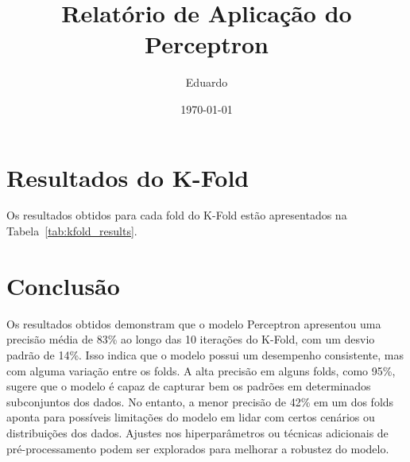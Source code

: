 \documentclass[a4paper,12pt]{article}
\begin{document}
\title{Relatório de Aplicação do Perceptron}
\author{Eduardo}
\date{\today}
\maketitle

\section*{Resultados do K-Fold}

Os resultados obtidos para cada fold do K-Fold estão apresentados na Tabela~\ref{tab:kfold_results}.

\begin{table}[H]
  \centering
  \caption{Resultados do K-Fold}
  \label{tab:kfold_results}
\end{table}

\section*{Conclusão}

Os resultados obtidos demonstram que o modelo Perceptron apresentou uma precisão média de 83\% ao longo das 10 iterações do K-Fold, com um desvio padrão de 14\%. Isso indica que o modelo possui um desempenho consistente, mas com alguma variação entre os folds. A alta precisão em alguns folds, como 95\%, sugere que o modelo é capaz de capturar bem os padrões em determinados subconjuntos dos dados. No entanto, a menor precisão de 42\% em um dos folds aponta para possíveis limitações do modelo em lidar com certos cenários ou distribuições dos dados. Ajustes nos hiperparâmetros ou técnicas adicionais de pré-processamento podem ser explorados para melhorar a robustez do modelo.
\end{document}

